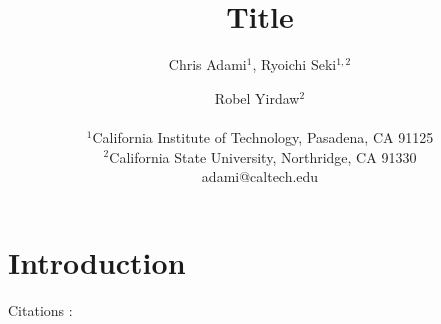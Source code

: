 \documentclass[letterpaper]{article}
\title{Title}
\author{Chris Adami$^{1}$, Ryoichi Seki$^{1,2}$ \and Robel Yirdaw$^2$ \\
\mbox{}\\
$^1$California Institute of Technology, Pasadena, CA 91125 \\
$^2$California State University, Northridge, CA 91330 \\
adami@caltech.edu}
\begin{document}
\maketitle

\begin{abstract}
\end{abstract}

\section{Introduction}

Citations :\citep{CA2}
\footnotesize


\end{document}

